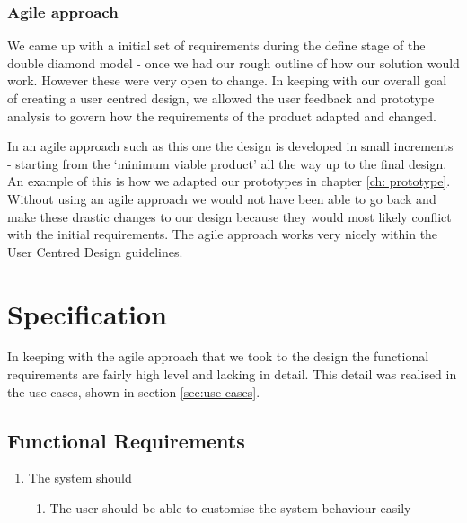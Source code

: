 \documentclass[a4paper]{report}
\begin{document}
\subsection{Agile approach}
We came up with a initial set of requirements during the define stage of the double diamond model - once we had our rough outline of how our solution would work. However these were very open to change. In keeping with our overall goal of creating a user centred design, we allowed the user feedback and prototype analysis to govern how the requirements of the product adapted and changed. 

In an agile approach such as this one the design is developed in small increments - starting from the `minimum viable product' all the way up to the final design. An example of this is how we adapted our prototypes in chapter \ref{ch: prototype}. Without using an agile approach we would not have been able to go back and make these drastic changes to our design because they would most likely conflict with the initial requirements. The agile approach works very nicely within the User Centred Design guidelines.

\chapter{Specification}
In keeping with the agile approach that we took to the design the functional requirements are fairly high level and lacking in detail. This detail was realised in the use cases, shown in section \ref{sec:use-cases}.
\section{Functional Requirements}
\label{sec:func_req}
\begin{enumerate}[label=\ref*{sec:func_req}.\arabic*.,leftmargin=*]
\item The system should 
\begin{enumerate}[label*=\arabic*.]
\item The user should be able to customise the system behaviour easily
\end{enumerate}
\end{enumerate}
\end{document}
